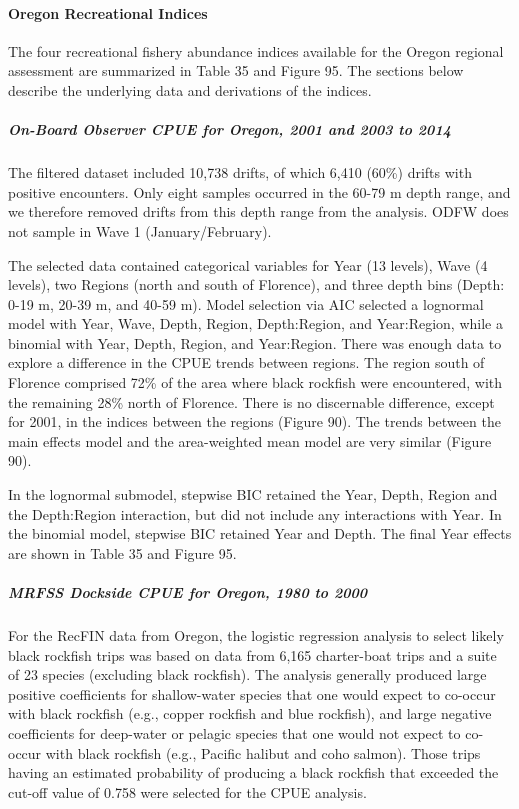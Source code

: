 \documentclass[11pt,
  english,
  letterpaper,
]{article}
\begin{document}
\hypertarget{oregon-recreational-indices}{%
\paragraph{Oregon Recreational Indices}\label{oregon-recreational-indices}}

The four recreational fishery abundance indices available for the Oregon regional assessment are summarized in Table 35 and Figure 95. The sections below describe the underlying data and derivations of the indices.

\hypertarget{on-board-observer-cpue-for-oregon-2001-and-2003-to-2014}{%
\subparagraph{On-Board Observer CPUE for Oregon, 2001 and 2003 to 2014}\label{on-board-observer-cpue-for-oregon-2001-and-2003-to-2014}}

The filtered dataset included 10,738 drifts, of which 6,410 (60\%) drifts with positive encounters. Only eight samples occurred in the 60-79 m depth range, and we therefore removed drifts from this depth range from the analysis. ODFW does not sample in Wave 1 (January/February).

The selected data contained categorical variables for Year (13 levels), Wave (4 levels), two Regions (north and south of Florence), and three depth bins (Depth: 0-19 m, 20-39 m, and 40-59 m). Model selection via AIC selected a lognormal model with Year, Wave, Depth, Region, Depth:Region, and Year:Region, while a binomial with Year, Depth, Region, and Year:Region. There was enough data to explore a difference in the CPUE trends between regions. The region south of Florence comprised 72\% of the area where black rockfish were encountered, with the remaining 28\% north of Florence. There is no discernable difference, except for 2001, in the indices between the regions (Figure 90). The trends between the main effects model and the area-weighted mean model are very similar (Figure 90).

In the lognormal submodel, stepwise BIC retained the Year, Depth, Region and the Depth:Region interaction, but did not include any interactions with Year. In the binomial model, stepwise BIC retained Year and Depth. The final Year effects are shown in Table 35 and Figure 95.

\hypertarget{mrfss-dockside-cpue-for-oregon-1980-to-2000}{%
\subparagraph{MRFSS Dockside CPUE for Oregon, 1980 to 2000}\label{mrfss-dockside-cpue-for-oregon-1980-to-2000}}

For the RecFIN data from Oregon, the logistic regression analysis to select likely black rockfish trips was based on data from 6,165 charter-boat trips and a suite of 23 species (excluding black rockfish). The analysis generally produced large positive coefficients for shallow-water species that one would expect to co-occur with black rockfish (e.g., copper rockfish and blue rockfish), and large negative coefficients for deep-water or pelagic species that one would not expect to co-occur with black rockfish (e.g., Pacific halibut and coho salmon). Those trips having an estimated probability of producing a black rockfish that exceeded the cut-off value of 0.758 were selected for the CPUE analysis.
\end{document}
